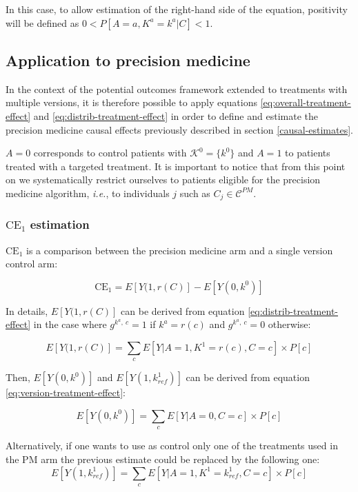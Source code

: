 \documentclass[a4paper,12pt,twoside,onecolumn,openright,final,oldfontcommands]{memoir}
\begin{document}
In this case, to allow estimation of the right-hand side of the
equation, positivity will be defined as \(0<P[A=a, K^a=k^a|C]<1\).

\subsection{Application to precision
medicine}\label{identification_causal_PM}

In the context of the potential outcomes framework extended to
treatments with multiple versions, it is therefore possible to apply
equations \eqref{eq:overall-treatment-effect} and
\eqref{eq:distrib-treatment-effect} in order to define and estimate the
precision medicine causal effects previously described in section
\ref{causal-estimates}.

\(A=0\) corresponds to control patients with \(\mathcal{K}^0=\{k^0\}\)
and \(A=1\) to patients treated with a targeted treatment. It is
important to notice that from this point on we systematically restrict
ourselves to patients eligible for the precision medicine algorithm,
\emph{i.e.}, to individuals \(j\) such as \(C_j \in \mathcal{C}^{PM}\).

\subsubsection{\texorpdfstring{\(\text{CE}_1\)
estimation}{\textbackslash{}text\{CE\}\_1 estimation}}\label{textce_1-estimation}

\(\text{CE}_1\) is a comparison between the precision medicine arm and a
single version control arm:

\begin{equation}
\text{CE}_1 = E[Y(1, r(C)] - E[Y(0, k^0)]
\label{eq:CE1}
\end{equation}

In details, \(E[Y(1, r(C)]\) can be derived from equation
\eqref{eq:distrib-treatment-effect} in the case where \(g^{k^a,~c}=1\) if
\(k^a=r(c)\) and \(g^{k^a,~c}=0\) otherwise:

\[E[Y(1, r(C)] = \sum_{c} E[Y | A=1,K^1=r(c), C=c] \times P[c]\]

Then, \(E[Y(0, k^0)]\) and \(E[Y(1, k^1_{ref})]\) can be derived from
equation \eqref{eq:version-treatment-effect}:

\[ E[Y(0, k^0)] = \sum_{c} E[Y | A=0, C=c] \times P[c] \]

Alternatively, if one wants to use as control only one of the treatments
used in the PM arm the previous estimate could be replaced by the
following one:
\[E[Y(1, k^1_{ref})] = \sum_{c} E[Y | A=1,K^1=k^1_{ref}, C=c] \times P[c]\]
\end{document}
